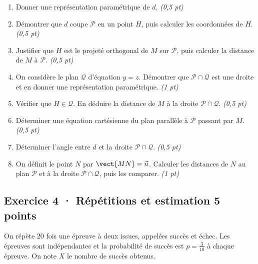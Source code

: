 \begin{enumerate}

\item Donner une représentation paramétrique de $d$. \hfill\textit{(0,5 pt)}

\item Démontrer que $d$ coupe $\mathcal P$ en un point $H$, puis calculer les coordonnées de $H$. \hfill\textit{(0,5 pt)}

\item Justifier que $H$ est le projeté orthogonal de $M$ sur $\mathcal P$, puis calculer la distance de $M$ à $\mathcal P$. \hfill\textit{(0,5 pt)}

\item On considère le plan $\mathcal Q$ d'équation $y=z$. Démontrer que $\mathcal P\cap\mathcal Q$ est une droite et en donner une représentation paramétrique. \hfill\textit{(1 pt)}

\item Vérifier que $H\in\mathcal Q$. En déduire la distance de $M$ à la droite $\mathcal P\cap\mathcal Q$. \hfill\textit{(0,5 pt)}

\item Déterminer une équation cartésienne du plan parallèle à $\mathcal P$ passant par $M$. \hfill\textit{(0,5 pt)}

\item Déterminer l'angle entre $d$ et la droite $\mathcal P\cap\mathcal Q$. \hfill\textit{(0,5 pt)}

\item On définit le point $N$ par $\vect{MN}=\vec n$. Calculer les distances de $N$ au plan $\mathcal P$ et à la droite $\mathcal P\cap\mathcal Q$, puis les comparer. \hfill\textit{(1 pt)}

\end{enumerate}

\subsection*{Exercice 4 · Répétitions et estimation \hfill 5 points}On répète $20$ fois une épreuve à deux issues, appelées succès et échec. Les épreuves sont indépendantes et la probabilité de succès est $p=\frac{3}{10}$ à chaque épreuve. On note $X$ le nombre de succès obtenus.

